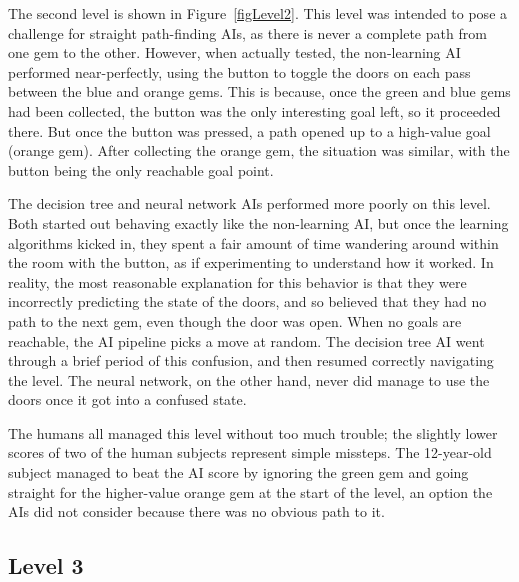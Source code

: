 \documentclass{article}
\begin{document}
The second level is shown in Figure~\ref{figLevel2}.  This level was intended to pose a challenge for straight path-finding AIs, as there is never a complete path from one gem to the other.  However, when actually tested, the non-learning AI performed near-perfectly, using the button to toggle the doors on each pass between the blue and orange gems.  This is because, once the green and blue gems had been collected, the button was the only interesting goal left, so it proceeded there.  But once the button was pressed, a path opened up to a high-value goal (orange gem).  After collecting the orange gem, the situation was similar, with the button being the only reachable goal point.

The decision tree and neural network AIs performed more poorly on this level.  Both started out behaving exactly like the non-learning AI, but once the learning algorithms kicked in, they spent a fair amount of time wandering around within the room with the button, as if experimenting to understand how it worked.  In reality, the most reasonable explanation for this behavior is that they were incorrectly predicting the state of the doors, and so believed that they had no path to the next gem, even though the door was open.  When no goals are reachable, the AI pipeline picks a move at random.  The decision tree AI went through a brief period of this confusion, and then resumed correctly navigating the level.  The neural network, on the other hand, never did manage to use the doors once it got into a confused state.

The humans all managed this level without too much trouble; the slightly lower scores of two of the human subjects represent simple missteps.  The 12-year-old subject managed to beat the AI score by ignoring the green gem and going straight for the higher-value orange gem at the start of the level, an option the AIs did not consider because there was no obvious path to it.

\subsection{Level 3}
\end{document}
